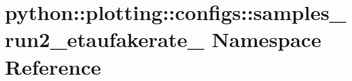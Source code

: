 \hypertarget{namespacepython_1_1plotting_1_1configs_1_1samples__run2__etaufakerate__2016}{
\section{python::plotting::configs::samples\_\-run2\_\-etaufakerate\_ Namespace Reference}
\label{namespacepython_1_1plotting_1_1configs_1_1samples__run2__etaufakerate__2016}
}
